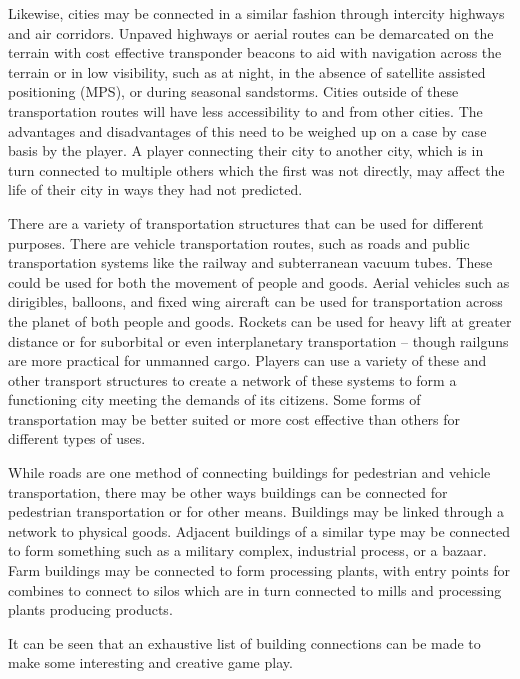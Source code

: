 Likewise, cities may be connected in a similar fashion through intercity highways and air corridors. Unpaved highways or aerial routes can be demarcated on the terrain with cost effective transponder beacons to aid with navigation across the terrain or in low visibility, such as at night, in the absence of satellite assisted positioning (MPS), or during seasonal sandstorms. Cities outside of these transportation routes will have less accessibility to and from other cities. The advantages and disadvantages of this need to be weighed up on a case by case basis by the player. A player connecting their city to another city, which is in turn connected to multiple others which the first was not directly, may affect the life of their city in ways they had not predicted.

There are a variety of transportation structures that can be used for different purposes. There are vehicle transportation routes, such as roads and public transportation systems like the railway and subterranean vacuum tubes. These could be used for both the movement of people and goods. Aerial vehicles such as dirigibles, balloons, and fixed wing aircraft can be used for transportation across the planet of both people and goods. Rockets can be used for heavy lift at greater distance or for suborbital or even interplanetary transportation -- though railguns are more practical for unmanned cargo. Players can use a variety of these and other transport structures to create a network of these systems to form a functioning city meeting the demands of its citizens. Some forms of transportation may be better suited or more cost effective than others for different types of uses. 

While roads are one method of connecting buildings for pedestrian and vehicle transportation, there may be other ways buildings can be connected for pedestrian transportation or for other means. Buildings may be linked through a network to physical goods. Adjacent buildings of a similar type may be connected to form something such as a military complex, industrial process, or a bazaar. Farm buildings may be connected to form processing plants, with entry points for combines to connect to silos which are in turn connected to mills and processing plants producing products. 

It can be seen that an exhaustive list of building connections can be made to make some interesting and creative game play.

